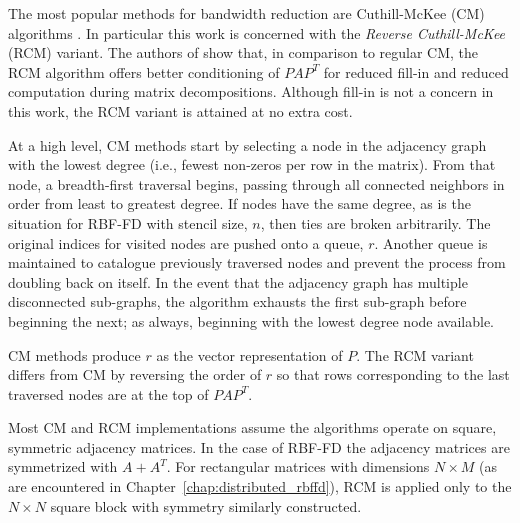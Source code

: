 \documentclass{report}
\begin{document}
The most popular methods for bandwidth reduction are Cuthill-McKee (CM) algorithms \cite{Cuthill1969, LiuSherman1976}. In particular this work is concerned with the \emph{Reverse Cuthill-McKee} (RCM) variant. The authors of \cite{LiuSherman1976} show that, in comparison to regular CM, the RCM algorithm offers better conditioning of $PAP^T$ for reduced fill-in and reduced computation during matrix decompositions. Although fill-in is not a concern in this work, the RCM variant is attained at no extra cost.

At a high level, CM methods start by selecting a node in the adjacency graph with the lowest degree (i.e., fewest non-zeros per row in the matrix). From that node, a breadth-first traversal begins, passing through all connected neighbors in order from least to greatest degree. If nodes have the same degree, as is the situation for RBF-FD with stencil size, $n$, then ties are broken arbitrarily. The original indices for visited nodes are pushed onto a queue, $r$. Another queue is maintained to catalogue previously traversed nodes and prevent the process from doubling back on itself. In the event that the adjacency graph has multiple disconnected sub-graphs, the algorithm exhausts the first sub-graph before beginning the next; as always, beginning with the lowest degree node available. 

CM methods produce $r$ as the vector representation of $P$. The RCM variant differs from CM by reversing the order of $r$ so that rows corresponding to the last traversed nodes are at the top of $PAP^T$. 

Most CM and RCM implementations assume the algorithms operate on square, symmetric adjacency matrices. In the case of RBF-FD the adjacency matrices are symmetrized with $A+A^T$. For rectangular matrices with dimensions $N \times M$ (as are encountered in Chapter~\ref{chap:distributed_rbffd}), RCM is applied only to the $N\times N$ square block with symmetry similarly constructed. 


%
\end{document}
